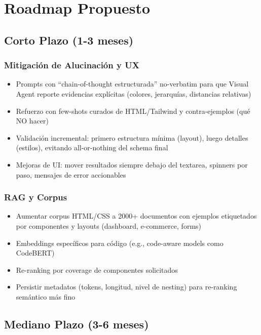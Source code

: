 \documentclass[12pt,a4paper]{article}
\begin{document}
\section{Roadmap Propuesto}

\subsection{Corto Plazo (1-3 meses)}

\subsubsection{Mitigación de Alucinación y UX}

\begin{itemize}
    \item Prompts con ``chain-of-thought estructurada'' no-verbatim para que Visual Agent reporte evidencias explícitas (colores, jerarquías, distancias relativas)
    \item Refuerzo con few-shots curados de HTML/Tailwind y contra-ejemplos (qué NO hacer)
    \item Validación incremental: primero estructura mínima (layout), luego detalles (estilos), evitando all-or-nothing del schema final
    \item Mejoras de UI: mover resultados siempre debajo del textarea, spinners por paso, mensajes de error accionables
\end{itemize}

\subsubsection{RAG y Corpus}

\begin{itemize}
    \item Aumentar corpus HTML/CSS a 2000+ documentos con ejemplos etiquetados por componentes y layouts (dashboard, e-commerce, forms)
    \item Embeddings específicos para código (e.g., code-aware models como CodeBERT)
    \item Re-ranking por coverage de componentes solicitados
    \item Persistir metadatos (tokens, longitud, nivel de nesting) para re-ranking semántico más fino
\end{itemize}

\subsection{Mediano Plazo (3-6 meses)}
\end{document}
